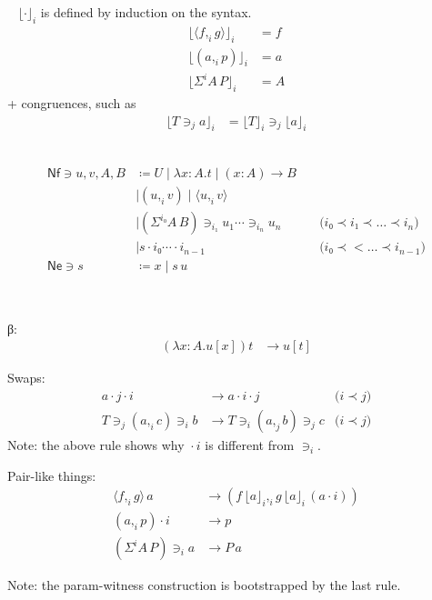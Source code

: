 \documentclass[10pt,a4paper]{article}
\newcommand\CP[3]{(#2,_{#1} #3)}
\newcommand\param[1]{\!\cdot\!#1}
\newcommand\op[1]{∋_{#1}}
\newcommand\ip[3]{Σ^{#1} {#2}\,{#3}}
\newcommand\fp[3]{⟨#2 ,_{#1} #3⟩}
\newcommand\proj[2]{⌊{#2}⌋_{#1}}
\begin{document}
\begin{definition}[Projection]~
  $\proj i \cdot$ is defined by induction on the syntax.
\begin{align*}
    \proj i {\fp i f g} & = f \\
  \proj i {(a,_i p)} &= a \\
  \proj i {\ip i A P} &= A
\end{align*}
+ congruences, such as
\begin{align*}
  \proj i {T \op j a} &= {\proj i T \op j \proj i a}
\end{align*}
\end{definition}


\begin{definition}~
  \begin{align*}
    \mathsf{Nf} ∋ u,v,A,B & \coloneqq
      U \mid λx:A. t \mid (x:A) → B \\
      & \mid \CP i u v \mid \fp i u v \\
      & \mid {(\ip {i₀} A B)} \op {i₁} {u_1 \cdots} \op {i_n} {u_n} &\quad \text{($i₀ \prec i₁ \prec \ldots \prec i_n$)} \\
      & \mid s \param {i₀} \cdots \param {i_{n-1}}                  &\quad \text{($i₀ \prec   < \ldots \prec i_{n-1}$)}
    \\
    \mathsf{Ne} ∋ s & \coloneqq x \mid s \, u
  \end{align*}
\end{definition}

\begin{definition}~

β:
\begin{align*}
  (λx:A. u[x]) t &→ u[t]
\end{align*}

Swaps:
\begin{align*}
  a \param j \param i &→ a \param i \param j             &\text{($i \prec j$)} \\
  T \op j \CP i a c \op i b &→ T \op i \CP j a b \op j c &\text{($i \prec j$)}
\end{align*}
Note: the above rule shows why ${} \param i {}$ is different from $\op i {}$.

Pair-like things:
\begin{align*}
  {\fp i f g} \, a      &→ (f\,{\proj i a} ,_i g\,{\proj i a}\,{(a \param i)}) \\
  {(a,_i p)} \param i   &→ p \\
  {(\ip i A P)} \op i a &→ P\,a
\end{align*}

Note: the param-witness construction is bootstrapped by the last rule.

\end{definition}
\end{document}
